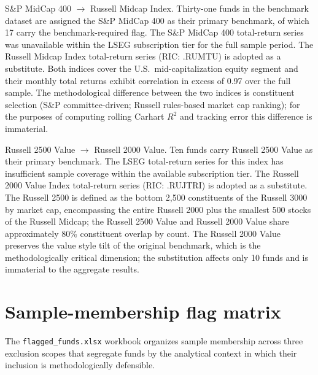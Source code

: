 \documentclass[12pt, oneside]{report}
\begin{document}
S\&P MidCap 400 $\rightarrow$ Russell Midcap Index.
Thirty-one funds in the benchmark dataset are assigned the S\&P
MidCap 400 as their primary benchmark, of which 17 carry the
benchmark-required flag. The S\&P MidCap 400 total-return series was
unavailable within the LSEG subscription tier for the full sample
period. The Russell Midcap Index total-return series (RIC:
.RUMTU) is adopted as a substitute. Both indices cover the
U.S.\ mid-capitalization equity segment and their monthly total
returns exhibit correlation in excess of 0.97 over the full sample.
The methodological difference between the two indices is constituent
selection (S\&P committee-driven; Russell rules-based market cap
ranking); for the purposes of computing rolling Carhart $R^2$ and
tracking error this difference is immaterial.

Russell 2500 Value $\rightarrow$ Russell 2000 Value. Ten
funds carry Russell 2500 Value as their primary benchmark. The LSEG
total-return series for this index has insufficient sample coverage
within the available subscription tier. The Russell 2000 Value Index
total-return series (RIC: .RUJTRI) is adopted as a
substitute. The Russell 2500 is defined as the bottom 2{,}500
constituents of the Russell 3000 by market cap, encompassing the
entire Russell 2000 plus the smallest 500 stocks of the Russell
Midcap; the Russell 2500 Value and Russell 2000 Value share
approximately 80\% constituent overlap by count. The Russell 2000
Value preserves the value style tilt of the original benchmark,
which is the methodologically critical dimension; the substitution
affects only 10 funds and is immaterial to the aggregate results.

\section{Sample-membership flag matrix}
\label{sec:sample_membership}

\noindent The \texttt{flagged\_funds.xlsx} workbook organizes sample
membership across three exclusion scopes that segregate funds by
the analytical context in which their inclusion is methodologically
defensible.
\end{document}
